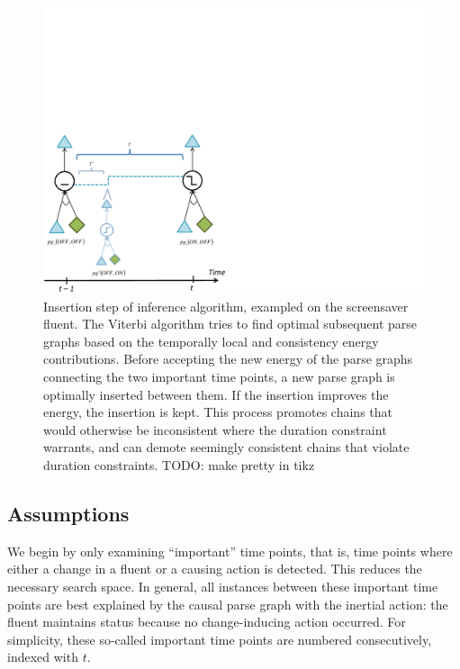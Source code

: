\documentclass[10pt,journal,letterpaper,compsoc]{IEEEtran}
\begin{document}
\begin{figure}[htp]
\centering
\includegraphics[trim = 0in 0in 5.25in 3.25in, clip, width=.9\linewidth]{inferencealgorithm.pdf}
\caption{Insertion step of inference algorithm, exampled on the screensaver fluent. The Viterbi algorithm tries to find optimal subsequent parse graphs based on the temporally local and consistency energy contributions.  Before accepting the new energy of the parse graphs connecting the two important time points, a new parse graph is optimally inserted between them.  If the insertion improves the energy, the insertion is kept.  This process promotes chains that would otherwise be inconsistent where the duration constraint warrants, and can demote seemingly consistent chains that violate duration constraints.
TODO: make pretty in tikz
\label{fig:inferencealgorithm}}
\end{figure}




\subsection{Assumptions}

We begin by only examining ``important'' time points, that is, time points where either a change in a fluent or a causing action is detected.  This reduces the necessary search space. In general, all instances between these important time points are best explained by the causal parse graph with the inertial action: the fluent maintains status because no change-inducing action occurred.   For simplicity, these so-called important time points are numbered consecutively, indexed with $t$.
\end{document}
